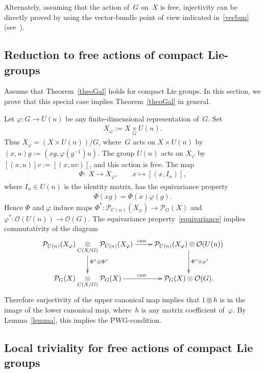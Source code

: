 \documentclass[11pt]{article}
\begin{document}
Alternately, assuming that the action of~$G$ on~$X$ is free, injectivity can be directly proved by using the
vector-bundle point of view indicated in~\eqref{vecbun} (see~\cite{bdh}).

\subsection{Reduction to free actions of compact Lie-groups}
\label{reduction}

Assume that Theorem~\ref{theoGal} holds for compact Lie groups.
In this section, we prove that this special case implies Theorem~\ref{theoGal} in general.

Let $\varphi\colon G\to U(n)$ be any f\/inite-dimensional representation of~$G$.
Set
\begin{gather*}
X_\varphi:=X\underset{G}{\times }U(n).
\end{gather*}
Thus $X_\varphi= (X
\times
U(n))/G$, where~$G$ acts on $X
\times
U(n)$ by $(x,u)g:= (xg,\varphi(g^{-1})u) $.
The group $U(n)$ acts on $X_\varphi$ by $[(x,u)]v:=[(x,uv)]$, and this action is free.
The map
\begin{gather*}
\Phi\colon \ X\longrightarrow X_\varphi,
\qquad
x\longmapsto [(x,I_n)],
\end{gather*}
where $I_n\in U(n)$ is the identity matrix, has the equivariance property
\begin{gather}
\label{equivariance}
\Phi(xg)=\Phi(x)\varphi(g).
\end{gather}
Hence $\Phi$ and $\varphi$ induce maps $\Phi^{*}\colon \mathcal{P}_{U(n)}(X_\varphi)\to \mathcal{P}_{G}(X)$ and
$\varphi^{*}\colon{\mathcal O}(U(n))\to{\mathcal O}(G)$.
The equivariance property~\eqref{equivariance} implies commutativity of the diagram
\begin{gather*}
\xymatrix{
\mathcal{P}_{U(n)}(X_\varphi)\underset{C(X/G)}{\otimes}\mathcal{P}_{U(n)}(X_\varphi)
\ar[r]^{\ \ \ {can}}\ar[d]^{\Phi^{*}\otimes\Phi^{*}}&
\mathcal{P}_{U(n)}(X_\varphi)\otimes{\mathcal O}(U(n))\ar[d]^{\Phi^{*}\otimes\varphi^{*}}\\
\mathcal{P}_{G}(X)\underset{C(X/G)}{\otimes}\mathcal{P}_{G}(X)\ar[r]^{\ \ \ {can}}& \mathcal{P}_{G}(X)\otimes{\mathcal O}(G).
}
\end{gather*}
Therefore surjectivity of the upper canonical map implies that $1\otimes h$ is in the image of the lower canonical map,
where~$h$ is any matrix coef\/f\/icient of~$\varphi$.
By Lemma~\ref{lemma}, this implies the PWG-condition.

\subsection{Local triviality for free actions of compact Lie groups}
\end{document}
